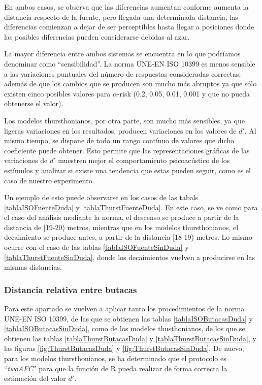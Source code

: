 \documentclass[11pt,a4paper,twoside]{book}
\begin{document}
            En ambos casos, se observa que las diferencias aumentan conforme aumenta la distancia respecto de la fuente, pero llegada una determinada distancia, las diferencias comienzan a dejar de ser perceptibles hasta llegar a posiciones donde las posibles diferencias pueden considerarse debidas al azar.
            
            La mayor diferencia entre ambos sistemas se encuentra en lo que podríamos denominar como ``sensibilidad''. La norma UNE-EN ISO 10399 es menos sensible a las variaciones puntuales del número de respuestas consideradas correctas; además de que los cambios que se producen son mucho más abruptos ya que sólo existen cinco posibles valores para $\alpha$-risk (0.2, 0.05, 0.01, 0.001 y que no pueda obtenerse el valor).
            
            Los modelos thursthonianos, por otra parte, son mucho más sensibles, ya que ligeras variaciones en los resultados, producen variaciones en los valores de $d'$. Al mismo tiempo, se dispone de todo un rango contínuo de valores que dicho coeficiente puede obtener. Esto permite que las representaciones gráficas de las variaciones de $d'$ muestren mejor el comportamiento psicoacústico de los estímulos y analizar si existe una tendencia que estas pueden seguir, como es el caso de nuestro experimento.
            
            Un ejemplo de esto puede observarse en los casos de las tabals \ref{tablaISOFuenteDuda} y \ref{tablaThurstFuenteDuda}. En este caso, se ve como para el caso del análisis mediante la norma, el descenso se produce a partir de la distancia de [19-20) metros, mientras que en los modelos thursthonianos, el decaimiento se produce antes, a partir de la distancia [18-19) metros. Lo mismo ocurre con el caso de las tablas \ref{tablaISOFuenteSinDuda} y \ref{tablaThurstFuenteSinDuda}, donde los decaimientos vuelven a producirse en las mismas distancias.
        
        \subsubsection*{Distancia relativa entre butacas}
            Para este apartado se vuelven a aplicar tanto los procedimientos de la norma UNE-EN ISO 10399, de las que se obtienen las tablas \ref{tablaISOButacasDuda} y \ref{tablaISOButacasSinDuda}, como de los modelos thusthonianos, de los que se obtienen las tablas \ref{tablaThurstButacasDuda} y \ref{tablaThurstButacasSinDuda}, y las figuras \ref{fig:ThurstButacasDuda} y \ref{fig:ThurstButacasSinDuda}. De nuevo, para los modelos thursthonianos, se ha determinado que el protocolo es ``\textit{twoAFC}'' para que la función de R pueda realizar de forma correcta la estimación del valor $d'$.\newline
            
\end{document}
